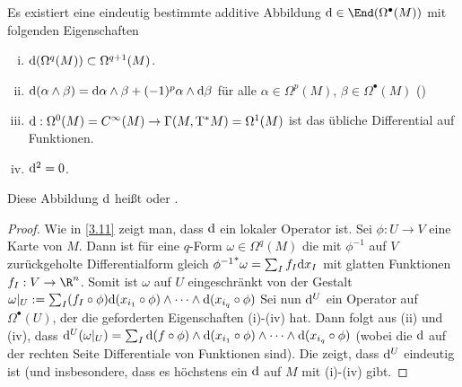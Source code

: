 \begin{st} \label{6.8}
    Es existiert eine eindeutig bestimmte additive Abbildung $\d \in \End(\Omega^\bullet(M))$ mit folgenden Eigenschaften
    \begin{enumerate}[i)]
        \item
            $\mathrm{d}(\Omega^q(M)) \subset \Omega^{q+1}(M)$.
        \item
            $\mathrm{d}(\alpha \wedge \beta) = \mathrm{d} \alpha \wedge \beta + (-1)^p \alpha \wedge \mathrm{d} \beta$ für alle $\alpha \in \Omega^p(M)$, $\beta \in \Omega^\bullet(M)$ ()
        \item
            $\mathrm{d}: \Omega^0(M) = C^\infty(M) \to \Gamma(M, \mathrm{T}^* M) = \Omega^1(M)$ ist das übliche Differential auf Funktionen.
        \item
            $\mathrm{d}^2 = 0$.
    \end{enumerate}
    Diese Abbildung $\mathrm{d}$ heißt  oder .
    \begin{proof}
        Wie in \ref{3.11} zeigt man, dass $\mathrm{d}$ ein lokaler Operator ist.
        Sei $\phi: U \to V$ eine Karte von $M$.
        Dann ist für eine $q$-Form $\omega \in \Omega^q(M)$ die mit $\phi^{-1}$ auf $V$ zurückgeholte Differentialform gleich ${\phi^{-1}}^* \omega = \sum_{I} f_I \mathrm{d} x_I$ mit glatten Funktionen $f_I: V \to \R^n$.
        Somit ist $\omega$ auf $U$ eingeschränkt von der Gestalt
        \begin{math}
            \omega|_U := \sum_I (f_I \circ \phi) \mathrm{d} (x_{i_1} \circ \phi) \wedge \dotsb \wedge \mathrm{d} (x_{i_q} \circ \phi)
        \end{math}
        Sei nun $\mathrm{d}^U$ ein Operator auf $\Omega^\bullet(U)$, der die geforderten Eigenschaften (i)-(iv) hat.
        Dann folgt aus (ii) und (iv), dass
        \begin{math}
            \mathrm{d}^U(\omega|_U)
            = \sum_{I} \mathrm{d}(f \circ \phi) \wedge \mathrm{d}(x_{i_1} \circ \phi) \wedge \dotsb \wedge \mathrm{d}(x_{i_q} \circ \phi)
        \end{math}
        (wobei die $\mathrm{d}$ auf der rechten Seite Differentiale von Funktionen sind).
        Die zeigt, dass $\mathrm{d}^U$ eindeutig ist (und insbesondere, dass es höchstens ein $\mathrm{d}$ auf $M$ mit (i)-(iv) gibt.


\end{proof}
\end{st}

